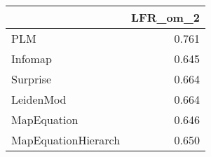 \begin{tabular}{lr}
\toprule
{} & LFR_om_2 \\
\midrule
PLM                 &    0.761 \\
Infomap             &    0.645 \\
Surprise            &    0.664 \\
LeidenMod           &    0.664 \\
MapEquation         &    0.646 \\
MapEquationHierarch &    0.650 \\
\bottomrule
\end{tabular}
